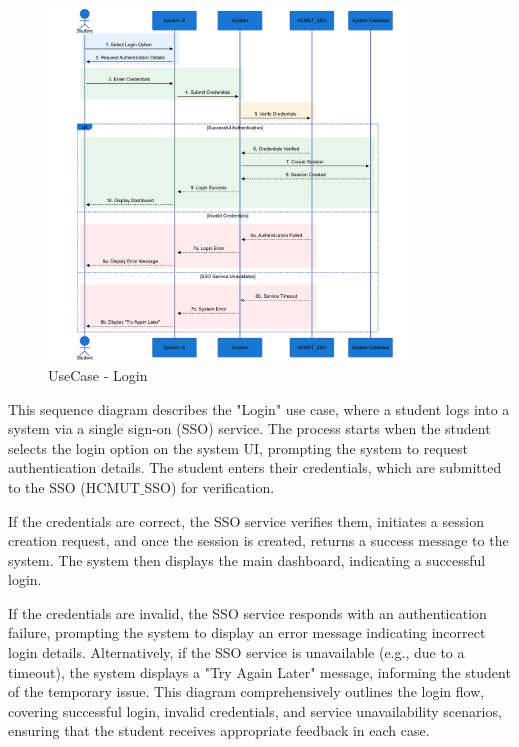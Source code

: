 \documentclass[a4paper]{report}
\begin{document}
\begin{figure}[H]
    \vspace{-0.5cm}
    \centering
    \includegraphics[width=0.85\textwidth]{images/sequence_diagram/Login.png}
    \caption{UseCase - Login}
    \label{fig:login}
\end{figure}


This sequence diagram describes the "Login" use case, where a student logs into a system via a single sign-on (SSO) service. The process starts when the student selects the login option on the system UI, prompting the system to request authentication details. The student enters their credentials, which are submitted to the SSO (HCMUT$\_$SSO) for verification.

If the credentials are correct, the SSO service verifies them, initiates a session creation request, and once the session is created, returns a success message to the system. The system then displays the main dashboard, indicating a successful login.

If the credentials are invalid, the SSO service responds with an authentication failure, prompting the system to display an error message indicating incorrect login details. Alternatively, if the SSO service is unavailable (e.g., due to a timeout), the system displays a "Try Again Later" message, informing the student of the temporary issue. This diagram comprehensively outlines the login flow, covering successful login, invalid credentials, and service unavailability scenarios, ensuring that the student receives appropriate feedback in each case.
\end{document}

